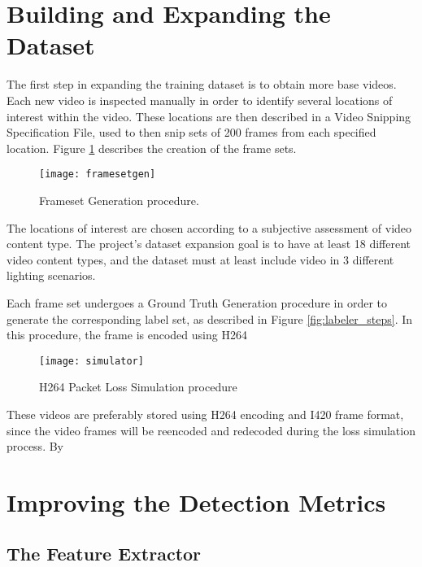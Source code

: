 \section{Building and Expanding the Dataset}
\label{sec:sol_dataset}

The first step in expanding the training dataset is to obtain more base videos. Each new video is inspected manually in order to identify several locations of interest within the video. These locations are then described in a Video Snipping Specification File, used to then snip sets of 200 frames from each specified location. Figure \ref{fig:framesetgen} describes the creation of the frame sets.

\begin{figure} [!h]
  \centering
  
  \texttt{[image: framesetgen]}
  
  \caption{Frameset Generation procedure.}
  \label{fig:framesetgen}

\end{figure}

The locations of interest are chosen according to a subjective assessment of video content type. The project's dataset expansion goal is to have at least 18 different video content types, and the dataset must at least include video in 3 different lighting scenarios.

Each frame set undergoes a Ground Truth Generation procedure in order to generate the corresponding label set, as described in Figure \ref{fig:labeler_steps}. In this procedure, the frame is encoded using H264

\begin{figure} [!h]
  \centering
  
  \texttt{[image: simulator]}
  
  \caption{H264 Packet Loss Simulation procedure}
  \label{fig:simulator}

\end{figure}

These videos are preferably stored using H264 encoding and I420 frame format, since the video frames will be reencoded and redecoded during the loss simulation process. By

\section{Improving the Detection Metrics}
\label{sec:sol_metrics}

\subsection{The Feature Extractor}
\label{sec:sol_features}

